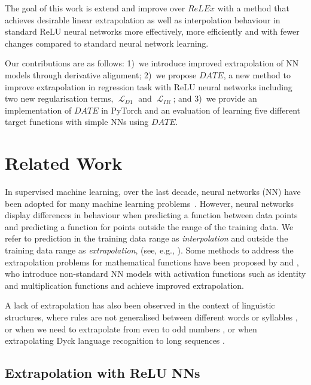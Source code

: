 \documentclass[runningheads]{llncs}
\DeclareMathOperator{\Lagr}{\mathcal{L}}
\begin{document}
The goal of this work is extend and improve over $ReLEx$ with a method that achieves desirable linear extrapolation as well as interpolation behaviour in standard ReLU neural networks more effectively, more efficiently and with fewer changes compared to standard neural network learning. 

Our contributions are as follows: 1)~we introduce improved extrapolation of NN models through derivative alignment; 
2)~we propose $DATE$, a new method to improve extrapolation in regression task with ReLU neural networks including two new regularisation terms, $\Lagr_{D1}$ and $\Lagr_{IR}$; and 
3)~we provide an implementation of $DATE$ in PyTorch and an evaluation of learning five different target functions with simple NNs using $DATE$.

\section{Related Work}

In supervised machine learning, over the last decade, neural networks (NN) have been adopted for many machine learning problems~\cite{goodfellow2016deep,Fan2019ASO}. 
However, neural networks display differences in behaviour when predicting a function between data points and predicting a function for points outside the range of the training data. 
We refer to prediction in the training data range as \emph{interpolation} and outside the training data range as \emph{extrapolation}, (see, e.g., \cite{Abiodun2018}). 
Some methods to address the extrapolation problems for mathematical functions have been proposed by
\cite{Sahoo2018} and \cite{Madsen2020}, who introduce non-standard NN models with activation functions such as identity and multiplication functions and achieve improved extrapolation.

A lack of extrapolation has also been observed in the context of linguistic structures, where rules are not generalised between different words or syllables \cite{LakeBaroni2017,Suzgun2019,Li2018,mitchell2018extrapolation}, or when we need to extrapolate from even to odd numbers \cite{Marcus1999}, or when extrapolating Dyck language recognition to long sequences \cite{ElNaggar2023TheoreticalCA}.


\subsection{Extrapolation with ReLU NNs}
\end{document}
